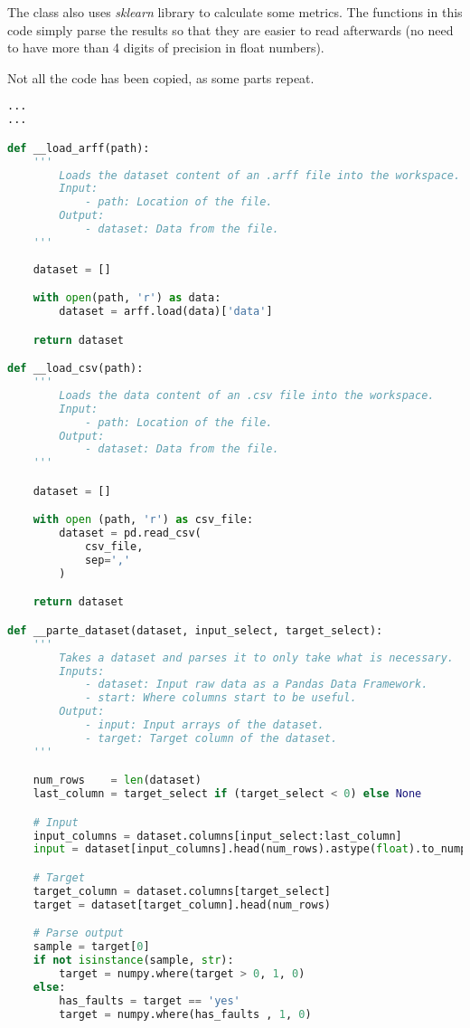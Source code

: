 The class also uses \textit{sklearn} library to calculate some metrics. The 
functions in this code simply parse the results so that they are easier to read
afterwards (no need to have more than 4 digits of precision in float numbers).

Not all the code has been copied, as some parts repeat. 

\begin{lstlisting}[language=Python, caption={Load datasets, calculate metrics, 
export results to CSV files, etc.}, label={lst:data}]
...
...

def __load_arff(path):
    '''
        Loads the dataset content of an .arff file into the workspace.
        Input:
            - path: Location of the file.
        Output:
            - dataset: Data from the file.
    '''
    
    dataset = []

    with open(path, 'r') as data:
        dataset = arff.load(data)['data']        

    return dataset

def __load_csv(path):
    '''
        Loads the data content of an .csv file into the workspace.
        Input:
            - path: Location of the file.
        Output:
            - dataset: Data from the file.
    '''

    dataset = []

    with open (path, 'r') as csv_file:
        dataset = pd.read_csv(
            csv_file,
            sep=','
        )

    return dataset

def __parte_dataset(dataset, input_select, target_select):
    '''
        Takes a dataset and parses it to only take what is necessary.
        Inputs:
            - dataset: Input raw data as a Pandas Data Framework.
            - start: Where columns start to be useful.
        Output:
            - input: Input arrays of the dataset.
            - target: Target column of the dataset.
    '''

    num_rows    = len(dataset)
    last_column = target_select if (target_select < 0) else None

    # Input
    input_columns = dataset.columns[input_select:last_column]
    input = dataset[input_columns].head(num_rows).astype(float).to_numpy()

    # Target
    target_column = dataset.columns[target_select]
    target = dataset[target_column].head(num_rows)

    # Parse output
    sample = target[0]
    if not isinstance(sample, str): 
        target = numpy.where(target > 0, 1, 0)
    else: 
        has_faults = target == 'yes'
        target = numpy.where(has_faults , 1, 0)


\end{lstlisting}

